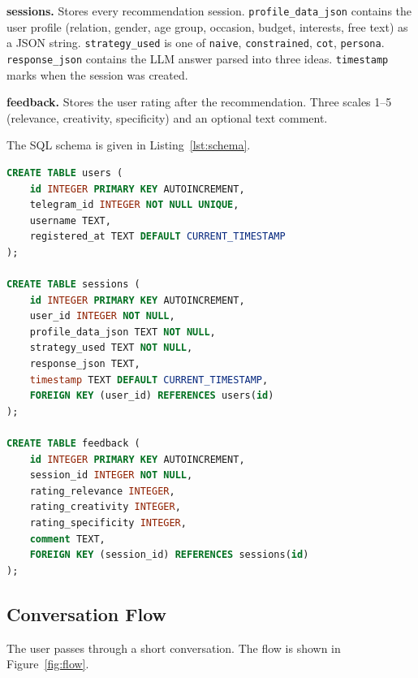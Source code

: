 \textbf{sessions.} Stores every recommendation session. \texttt{profile\_data\_json} contains the user profile (relation, gender, age group, occasion, budget, interests, free text) as a JSON string. \texttt{strategy\_used} is one of \texttt{naive}, \texttt{constrained}, \texttt{cot}, \texttt{persona}. \texttt{response\_json} contains the LLM answer parsed into three ideas. \texttt{timestamp} marks when the session was created.

\textbf{feedback.} Stores the user rating after the recommendation. Three scales 1--5 (relevance, creativity, specificity) and an optional text comment.

The SQL schema is given in Listing~\ref{lst:schema}.

\begin{lstlisting}[language=SQL, caption={Database schema in SQL.}, label={lst:schema}]
CREATE TABLE users (
    id INTEGER PRIMARY KEY AUTOINCREMENT,
    telegram_id INTEGER NOT NULL UNIQUE,
    username TEXT,
    registered_at TEXT DEFAULT CURRENT_TIMESTAMP
);

CREATE TABLE sessions (
    id INTEGER PRIMARY KEY AUTOINCREMENT,
    user_id INTEGER NOT NULL,
    profile_data_json TEXT NOT NULL,
    strategy_used TEXT NOT NULL,
    response_json TEXT,
    timestamp TEXT DEFAULT CURRENT_TIMESTAMP,
    FOREIGN KEY (user_id) REFERENCES users(id)
);

CREATE TABLE feedback (
    id INTEGER PRIMARY KEY AUTOINCREMENT,
    session_id INTEGER NOT NULL,
    rating_relevance INTEGER,
    rating_creativity INTEGER,
    rating_specificity INTEGER,
    comment TEXT,
    FOREIGN KEY (session_id) REFERENCES sessions(id)
);
\end{lstlisting}

\subsection{Conversation Flow}

The user passes through a short conversation. The flow is shown in Figure~\ref{fig:flow}.


